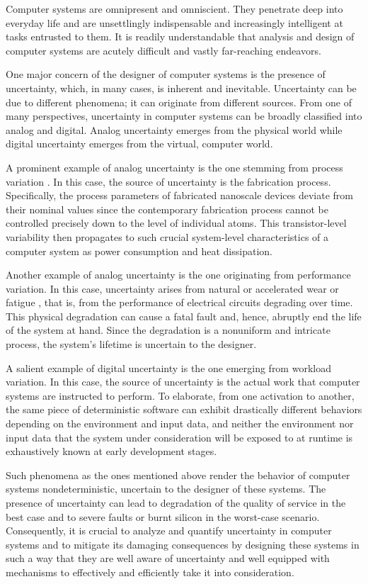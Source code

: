Computer systems are omnipresent and omniscient. They penetrate deep into
everyday life and are unsettlingly indispensable and increasingly intelligent at
tasks entrusted to them. It is readily understandable that analysis and design
of computer systems are acutely difficult and vastly far-reaching endeavors.

One major concern of the designer of computer systems is the presence of
uncertainty, which, in many cases, is inherent and inevitable. Uncertainty can
be due to different phenomena; it can originate from different sources. From one
of many perspectives, uncertainty in computer systems can be broadly classified
into analog and digital. Analog uncertainty emerges from the physical world
while digital uncertainty emerges from the virtual, computer world.

A prominent example of analog uncertainty is the one stemming from process
variation \cite{srivastava2010}. In this case, the source of uncertainty is the
fabrication process. Specifically, the process parameters of fabricated
nanoscale devices deviate from their nominal values since the contemporary
fabrication process cannot be controlled precisely down to the level of
individual atoms. This transistor-level variability then propagates to such
crucial system-level characteristics of a computer system as power consumption
and heat dissipation.

Another example of analog uncertainty is the one originating from performance
variation. In this case, uncertainty arises from natural or accelerated wear or
fatigue \cite{jedec2016}, that is, from the performance of electrical circuits
degrading over time. This physical degradation can cause a fatal fault and,
hence, abruptly end the life of the system at hand. Since the degradation is a
nonuniform and intricate process, the system's lifetime is uncertain to the
designer.

A salient example of digital uncertainty is the one emerging from workload
variation. In this case, the source of uncertainty is the actual work that
computer systems are instructed to perform. To elaborate, from one activation to
another, the same piece of deterministic software can exhibit drastically
different behaviors depending on the environment and input data, and neither the
environment nor input data that the system under consideration will be exposed
to at runtime is exhaustively known at early development stages.

Such phenomena as the ones mentioned above render the behavior of computer
systems nondeterministic, uncertain to the designer of these systems. The
presence of uncertainty can lead to degradation of the quality of service in the
best case and to severe faults or burnt silicon in the worst-case scenario.
Consequently, it is crucial to analyze and quantify uncertainty in computer
systems and to mitigate its damaging consequences by designing these systems in
such a way that they are well aware of uncertainty and well equipped with
mechanisms to effectively and efficiently take it into consideration.

